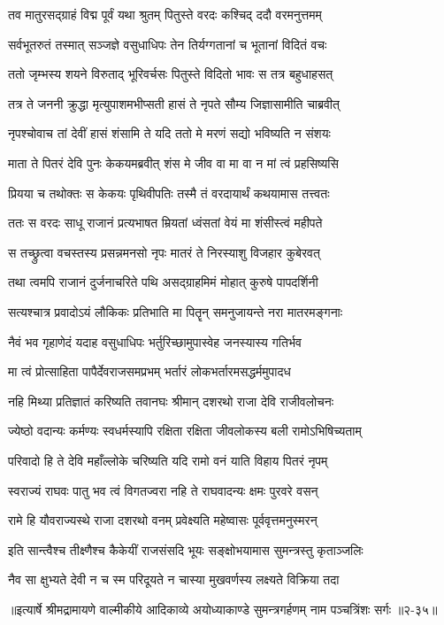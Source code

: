 \twolineshloka
{तव मातुरसद्ग्राहं विद्म पूर्वं यथा श्रुतम्}
{पितुस्ते वरदः कश्चिद् ददौ वरमनुत्तमम्} %

\twolineshloka
{सर्वभूतरुतं तस्मात् सञ्जज्ञे वसुधाधिपः}
{तेन तिर्यग्गतानां च भूतानां विदितं वचः} %

\twolineshloka
{ततो जृम्भस्य शयने विरुताद् भूरिवर्चसः}
{पितुस्ते विदितो भावः स तत्र बहुधाहसत्} %

\twolineshloka
{तत्र ते जननी क्रुद्धा मृत्युपाशमभीप्सती}
{हासं ते नृपते सौम्य जिज्ञासामीति चाब्रवीत्} %

\twolineshloka
{नृपश्चोवाच तां देवीं हासं शंसामि ते यदि}
{ततो मे मरणं सद्यो भविष्यति न संशयः} %

\twolineshloka
{माता ते पितरं देवि पुनः केकयमब्रवीत्}
{शंस मे जीव वा मा वा न मां त्वं प्रहसिष्यसि} %

\twolineshloka
{प्रियया च तथोक्तः स केकयः पृथिवीपतिः}
{तस्मै तं वरदायार्थं कथयामास तत्त्वतः} %

\twolineshloka
{ततः स वरदः साधू राजानं प्रत्यभाषत}
{म्रियतां ध्वंसतां वेयं मा शंसीस्त्वं महीपते} %

\twolineshloka
{स तच्छ्रुत्वा वचस्तस्य प्रसन्नमनसो नृपः}
{मातरं ते निरस्याशु विजहार कुबेरवत्} %

\twolineshloka
{तथा त्वमपि राजानं दुर्जनाचरिते पथि}
{असद्ग्राहमिमं मोहात् कुरुषे पापदर्शिनी} %

\twolineshloka
{सत्यश्चात्र प्रवादोऽयं लौकिकः प्रतिभाति मा}
{पितॄन् समनुजायन्ते नरा मातरमङ्गनाः} %

\twolineshloka
{नैवं भव गृहाणेदं यदाह वसुधाधिपः}
{भर्तुरिच्छामुपास्वेह जनस्यास्य गतिर्भव} %

\twolineshloka
{मा त्वं प्रोत्साहिता पापैर्देवराजसमप्रभम्}
{भर्तारं लोकभर्तारमसद्धर्ममुपादध} %

\twolineshloka
{नहि मिथ्या प्रतिज्ञातं करिष्यति तवानघः}
{श्रीमान् दशरथो राजा देवि राजीवलोचनः} %

\twolineshloka
{ज्येष्ठो वदान्यः कर्मण्यः स्वधर्मस्यापि रक्षिता}
{रक्षिता जीवलोकस्य बली रामोऽभिषिच्यताम्} %

\twolineshloka
{परिवादो हि ते देवि महाँल्लोके चरिष्यति}
{यदि रामो वनं याति विहाय पितरं नृपम्} %

\twolineshloka
{स्वराज्यं राघवः पातु भव त्वं विगतज्वरा}
{नहि ते राघवादन्यः क्षमः पुरवरे वसन्} %

\twolineshloka
{रामे हि यौवराज्यस्थे राजा दशरथो वनम्}
{प्रवेक्ष्यति महेष्वासः पूर्ववृत्तमनुस्मरन्} %

\twolineshloka
{इति सान्त्वैश्च तीक्ष्णैश्च कैकेयीं राजसंसदि}
{भूयः सङ्क्षोभयामास सुमन्त्रस्तु कृताञ्जलिः} %

\twolineshloka
{नैव सा क्षुभ्यते देवी न च स्म परिदूयते}
{न चास्या मुखवर्णस्य लक्ष्यते विक्रिया तदा} %


॥इत्यार्षे श्रीमद्रामायणे वाल्मीकीये आदिकाव्ये अयोध्याकाण्डे सुमन्त्रगर्हणम् नाम पञ्चत्रिंशः सर्गः ॥२-३५॥
